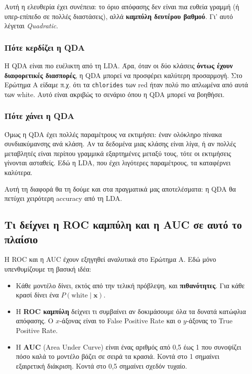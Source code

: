 \documentclass[11pt,a4paper]{article}
\newcommand{\code}[1]{\texttt{#1}}
\begin{document}
Αυτή η ελευθερία έχει συνέπεια: το όριο απόφασης δεν είναι πια ευθεία
γραμμή (ή υπερ-επίπεδο σε πολλές διαστάσεις), αλλά \textbf{καμπύλη
δευτέρου βαθμού}. Γι' αυτό λέγεται \emph{Quadratic}.

\subsubsection{Πότε κερδίζει η QDA}

Η QDA είναι πιο ευέλικτη από τη LDA. Άρα, όταν οι δύο κλάσεις
\textbf{όντως έχουν διαφορετικές διασπορές}, η QDA μπορεί να προσφέρει
καλύτερη προσαρμογή. Στο Ερώτημα Α είδαμε π.χ. ότι τα \code{chlorides}
των red ήταν πολύ πιο απλωμένα από αυτά των white. Αυτό είναι ακριβώς το
σενάριο όπου η QDA μπορεί να βοηθήσει.

\subsubsection{Πότε χάνει η QDA}

Όμως η QDA έχει πολλές παραμέτρους να εκτιμήσει: έναν ολόκληρο πίνακα
συνδιακύμανσης ανά κλάση. Αν τα δεδομένα μιας κλάσης είναι λίγα, ή αν
πολλές μεταβλητές είναι περίπου γραμμικά εξαρτημένες μεταξύ τους, τότε
οι εκτιμήσεις γίνονται ασταθείς. Εδώ η LDA, που έχει λιγότερες
παραμέτρους, τα καταφέρνει καλύτερα.

Αυτή τη διαφορά θα τη δούμε και στα πραγματικά μας αποτελέσματα: η QDA
θα πετύχει χειρότερη accuracy από τη LDA.

\subsection{Τι δείχνει η ROC καμπύλη και η AUC σε αυτό το πλαίσιο}

Η ROC και η AUC έχουν εξηγηθεί αναλυτικά στο Ερώτημα Α. Εδώ μόνο
υπενθυμίζουμε τη βασική ιδέα:
\begin{itemize}
    \item Κάθε μοντέλο δίνει, εκτός από την τελική πρόβλεψη, και
    \textbf{πιθανότητες}. Για κάθε κρασί δίνει ένα \(P(\text{white}
    \mid \mathbf{x})\).
    \item Η \textbf{ROC καμπύλη} δείχνει τι συμβαίνει αν δοκιμάσουμε όλα
    τα δυνατά κατώφλια απόφασης. Ο \(x\)-άξονας είναι το False Positive
    Rate και ο \(y\)-άξονας το True Positive Rate.
    \item Η \textbf{AUC} (Area Under Curve) είναι ένας αριθμός από 0,5
    έως 1 που συνοψίζει πόσο καλά το μοντέλο βάζει σε σειρά τα κρασιά.
    Κοντά στο 1 σημαίνει εξαιρετική διάκριση. Κοντά στο 0,5 σημαίνει
    σχεδόν τυχαίο.
\end{itemize}
\end{document}
